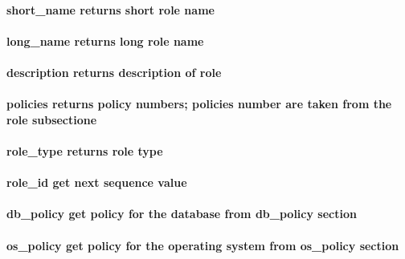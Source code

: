 \paragraph*{short\_name
 returns short role name\label{Apiis::Auth::Role_pm_short_name_returns_short_role_name}}
\paragraph*{long\_name
 returns long role name\label{Apiis::Auth::Role_pm_long_name_returns_long_role_name}}
\paragraph*{description
 returns description of role\label{Apiis::Auth::Role_pm_description_returns_description_of_role}}
\paragraph*{policies
 returns policy numbers; policies number are taken from the role subsectione\label{Apiis::Auth::Role_pm_policies_returns_policy_numbers_policies_number_are_taken_from_the_role_subsectione}}
\paragraph*{role\_type
  returns role type\label{Apiis::Auth::Role_pm_role_type_returns_role_type}}
\paragraph*{role\_id
  get next sequence value\label{Apiis::Auth::Role_pm_role_id_get_next_sequence_value}}
\paragraph*{db\_policy
 get policy for the database from db\_policy section\label{Apiis::Auth::Role_pm_db_policy_get_policy_for_the_database_from_db_policy_section}}
\paragraph*{os\_policy
 get policy for the operating system from os\_policy section\label{Apiis::Auth::Role_pm_os_policy_get_policy_for_the_operating_system_from_os_policy_section}}
